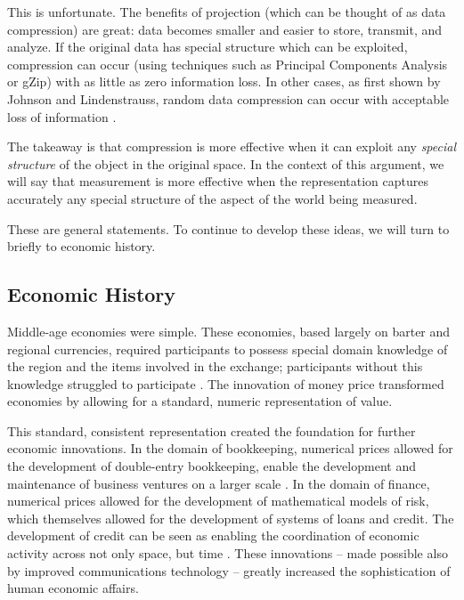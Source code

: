 This is unfortunate.
The benefits of projection (which can be thought of as data compression) are great: data becomes smaller and easier to store, transmit, and analyze.
If the original data has special structure which can be exploited, compression can occur (using techniques such as Principal Components Analysis or gZip) with as little as zero information loss.
In other cases, as first shown by Johnson and Lindenstrauss, random data compression can occur with acceptable loss of information \cite{dasgupta}.

The takeaway is that compression is more effective when it can exploit any \textit{special structure} of the object in the original space.
In the context of this argument, we will say that measurement is more effective when the representation captures accurately any special structure of the aspect of the world being measured.

These are general statements.
To continue to develop these ideas, we will turn to briefly to economic history.

\printglossary

\subsection{Economic History}

Middle-age economies were simple.
These economies, based largely on barter and regional currencies, required participants to possess special domain knowledge of the region and the items involved in the exchange; participants without this knowledge struggled to participate \cite{heilbroner}.
The innovation of money price transformed economies by allowing for a standard, numeric representation of value.

This standard, consistent representation created the foundation for further economic innovations.
In the domain of bookkeeping, numerical prices allowed for the development of double-entry bookkeeping, enable the development and maintenance of business ventures on a larger scale \cite{ferguson}.
In the domain of finance, numerical prices allowed for the development of mathematical models of risk, which themselves allowed for the development of systems of loans and credit.
The development of credit can be seen as enabling the coordination of economic activity across not only space, but time \cite{ferguson}.
These innovations -- made possible also by improved communications technology -- greatly increased the sophistication of human economic affairs.

